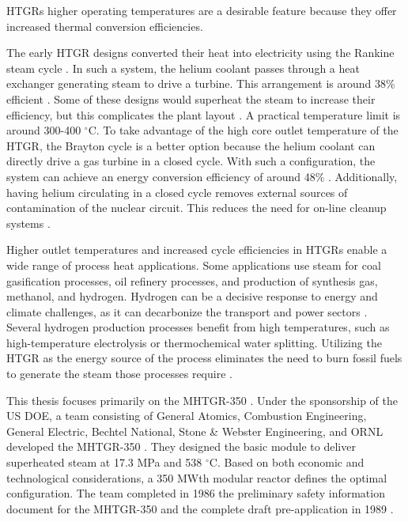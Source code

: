 HTGRs higher operating temperatures are a desirable feature because they offer increased thermal conversion efficiencies.


The early \gls{HTGR} designs converted their heat into electricity using the Rankine steam cycle \cite{herranz_power_2009}.
In such a system, the helium coolant passes through a heat exchanger generating steam to drive a  turbine.
This arrangement is around 38\% efficient \cite{breeze_nuclear_2014}.
Some of these designs would superheat the steam to increase their efficiency, but this complicates the plant layout \cite{ballinger_balance_2004}.
A practical temperature limit is around 300-400 $^{\circ}$C.
To take advantage of the high core outlet temperature of the \gls{HTGR}, the Brayton cycle is a better option because the helium coolant can directly drive a gas turbine in a closed cycle.
With such a configuration, the system can achieve an energy conversion efficiency of around 48\% \cite{breeze_nuclear_2014}.
Additionally, having helium circulating in a closed cycle removes external sources of contamination of the nuclear circuit.
This reduces the need for on-line cleanup systems \cite{iaea_current_2001}.

Higher outlet temperatures and increased cycle efficiencies in HTGRs enable a wide range of process heat applications.
Some applications use steam for coal gasification processes, oil refinery processes, and production of synthesis gas, methanol, and hydrogen.
Hydrogen can be a decisive response to energy and climate challenges, as it can decarbonize the transport and power sectors \cite{nagashima_japans_2018}.
Several hydrogen production processes benefit from high temperatures, such as high-temperature electrolysis or thermochemical water splitting.
Utilizing the \gls{HTGR} as the energy source of the process eliminates the need to burn fossil fuels to generate the steam those processes require \cite{iaea_current_2001}.

This thesis focuses primarily on the \gls{MHTGR}-350 \cite{neylan_modular_1988} \cite{silady_licensing_1988}.
Under the sponsorship of the \gls{US} \gls{DOE}, a team consisting of General Atomics, Combustion Engineering, General Electric, Bechtel National, Stone \& Webster Engineering, and \gls{ORNL} developed the \gls{MHTGR}-350 \cite{neylan_modular_1988}.
They designed the basic module to deliver superheated steam at 17.3 MPa and 538 $^{\circ}$C.
Based on both economic and technological considerations, a 350 MWth modular reactor defines the optimal configuration.
The team completed in 1986 the preliminary safety information document for the MHTGR-350 and the complete draft pre-application in 1989 \cite{huning_steady_2014}.


